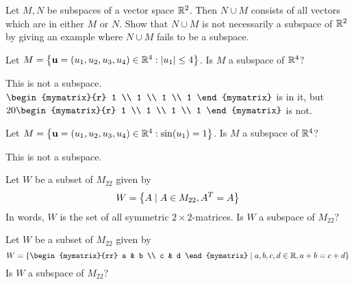 \begin{ex}
  Let $M,N$ be subspaces of a vector space $\mathbb{R}^{2}$. Then $N\cup
  M$ consists of all vectors which are in either $M$ or $N$. Show that $N\cup
  M $ is not necessarily a subspace of $\mathbb{R}^{2}$ by giving an example
  where $N\cup M$ fails to be a subspace.
\end{ex}

\begin{ex} Let $M=\left\{\mbox{\bf u}=(u_{1},u_{2},u_{3},u_{4}) \in
\mathbb{R}^{4}:\left|u_{1}\right| \leq 4\right\}$. Is $M$ a subspace of $\mathbb{R}^4$?
\begin{sol}
This is not a subspace. $\begin{mymatrix}{r}
1 \\
1 \\
1 \\
1
\end{mymatrix} $ is in
it, but $20\begin{mymatrix}{r}
1 \\
1 \\
1 \\
1
\end{mymatrix} $ is not.
\end{sol}
\end{ex}

\begin{ex} Let $M=\left\{\mbox{\bf u}=(u_{1},u_{2},u_{3},u_{4}) \in
\mathbb{R}^{4}:\sin (u_{1}) =1\right\}$. Is $M$ a subspace of $\mathbb{R}^4$?
\begin{sol}
This is not a subspace.
\end{sol}
\end{ex}

\begin{ex} Let $W$ be a subset of $M_{22}$ given by
\[
W = \left\{A \mid A \in M_{22}, A^T = A \right\}
\]
In words, $W$ is the set of all symmetric $2 \times 2$-matrices. Is $W$ a subspace of $M_{22}$?
\end{ex}

\begin{ex} Let $W$ be a subset of $M_{22}$ given by
\[
W = \set{\begin{mymatrix}{rr}
a  & b \\
c & d
\end{mymatrix} \mid a,b,c,d \in \R, a + b = c + d }
\]
Is $W$ a subspace of $M_{22}$?
\end{ex}

